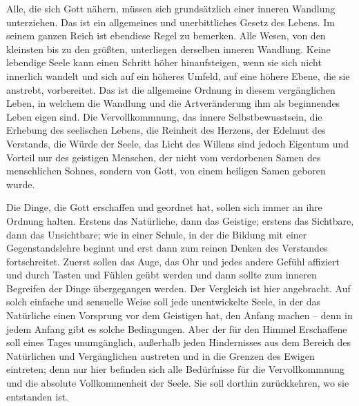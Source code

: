 Alle, die sich Gott nähern, müssen sich grundsätzlich einer inneren Wandlung unterziehen. Das ist ein allgemeines und unerbittliches Gesetz des Lebens. Im seinem ganzen Reich ist ebendiese Regel zu bemerken. Alle Wesen, von den kleinsten bis zu den größten, unterliegen derselben inneren Wandlung. Keine lebendige Seele kann einen Schritt höher hinaufsteigen, wenn sie sich nicht innerlich wandelt und sich auf ein höheres Umfeld, auf eine höhere Ebene, die sie anstrebt, vorbereitet. Das ist die allgemeine Ordnung in diesem vergänglichen Leben, in welchem die Wandlung und die Artveränderung ihm als beginnendes Leben eigen sind. Die Vervollkommnung, das innere Selbstbewusstsein, die Erhebung des seelischen Lebens, die Reinheit des Herzens, der Edelmut des Verstands, die Würde der Seele, das Licht des Willens sind jedoch Eigentum und Vorteil nur des geistigen Menschen, der nicht vom verdorbenen Samen des menschlichen Sohnes, sondern von Gott, von einem heiligen Samen geboren wurde. 

Die Dinge, die Gott erschaffen und geordnet hat, sollen sich immer an ihre Ordnung halten. Erstens das Natürliche, dann das Geistige; erstens das Sichtbare, dann das Unsichtbare; wie in einer Schule, in der die Bildung mit einer Gegenstandslehre beginnt und erst dann zum reinen Denken des Verstandes fortschreitet. Zuerst sollen das Auge, das Ohr und jedes andere Gefühl affiziert und durch Tasten und Fühlen geübt werden und dann sollte zum inneren Begreifen der Dinge übergegangen werden. Der Vergleich ist hier angebracht. Auf solch einfache und sensuelle Weise soll jede unentwickelte Seele, in der das Natürliche einen Vorsprung vor dem Geistigen hat, den Anfang machen -- denn in jedem Anfang gibt es solche Bedingungen. Aber der für den Himmel Erschaffene soll eines Tages unumgänglich, außerhalb jeden Hindernisses aus dem Bereich des Natürlichen und Vergänglichen austreten und in die Grenzen des Ewigen eintreten; denn nur hier befinden sich alle Bedürfnisse für die Vervollkommnung und die absolute Vollkommenheit der Seele. Sie soll dorthin zurückkehren, wo sie entstanden ist. 

